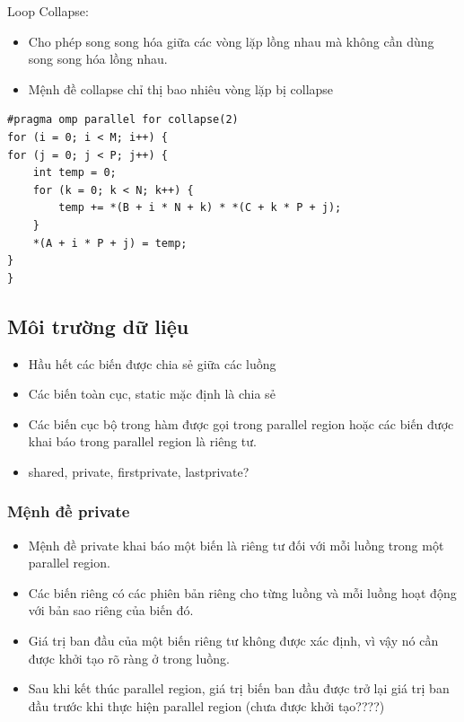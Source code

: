 \documentclass[14pt, a4paper]{article}
\numberwithin{equation}{section}
\numberwithin{figure}{section}
\numberwithin{dl}{section}
\numberwithin{md}{section}
\numberwithin{bd}{section}
\numberwithin{dn}{section}
\numberwithin{hq}{section}
\begin{document}
Loop Collapse:

\begin{itemize}
    \item Cho phép song song hóa giữa các vòng lặp lồng nhau mà không cần dùng song song hóa lồng nhau.
    \item Mệnh đề collapse chỉ thị bao nhiêu vòng lặp bị collapse
\end{itemize}
\begin{verbatim}
#pragma omp parallel for collapse(2)
for (i = 0; i < M; i++) {
for (j = 0; j < P; j++) {
    int temp = 0;
    for (k = 0; k < N; k++) {
        temp += *(B + i * N + k) * *(C + k * P + j);
    }
    *(A + i * P + j) = temp;
}
}
\end{verbatim}

\subsection{Môi trường dữ liệu}

\begin{itemize}
    \item Hầu hết các biến được chia sẻ giữa các luồng
    \item Các biến toàn cục, static mặc định là chia sẻ
    \item Các biến cục bộ trong hàm được gọi trong parallel region hoặc các biến được khai báo trong parallel region là riêng tư.
    \item shared, private, firstprivate, lastprivate?
\end{itemize}

\subsubsection{Mệnh đề private}

\begin{itemize}
    \item Mệnh đề private khai báo một biến là riêng tư đối với mỗi luồng trong một parallel region.
    \item Các biến riêng có các phiên bản riêng cho từng luồng và mỗi luồng hoạt động với bản sao riêng của biến đó.
    \item Giá trị ban đầu của một biến riêng tư không được xác định, vì vậy nó cần được khởi tạo rõ ràng ở trong luồng.
    \item Sau khi kết thúc parallel region, giá trị biến ban đầu được trở lại giá trị ban đầu trước khi thực hiện parallel region (chưa được khởi tạo????)
\end{itemize}
\end{document}
